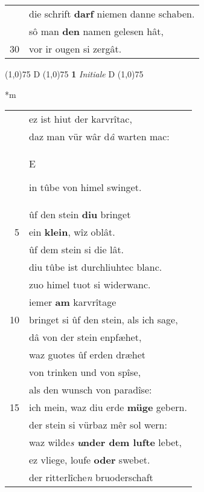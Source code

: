 \documentclass[8pt,a4paper,notitlepage]{article}
\begin{document}
\begin{table}[ht]
\begin{minipage}[t]{0.5\linewidth}
\begin{tabular}{rl}
 & die schrift \textbf{darf} niemen danne schaben.\\ 
 & sô man \textbf{den} namen gelesen hât,\\ 
30 & vor ir ougen si zergât.\\ 
\end{tabular}
\scriptsize
\line(1,0){75} \newline
D \newline
\line(1,0){75} \newline
\textbf{1} \textit{Initiale} D  \newline
\line(1,0){75} \newline
\newline
\end{minipage}
\hspace{0.5cm}
\begin{minipage}[t]{0.5\linewidth}
\small
\begin{center}*m
\end{center}
\begin{tabular}{rl}
 & ez ist hiut der karvrîtac,\\ 
 & daz man vür wâr d\textit{â} warten mac:\\ 
 & \begin{large}E\end{large}in tûbe von himel swinget.\\ 
 & ûf den stein \textbf{diu} bringet\\ 
5 & ein \textbf{klein}, wîz oblât.\\ 
 & ûf dem stein si die lât.\\ 
 & diu tûbe ist durchliuhtec blanc.\\ 
 & zuo himel tuot si widerwanc.\\ 
 & iemer \textbf{am} karvrîtage\\ 
10 & bringet si ûf den stein, als ich sage,\\ 
 & dâ von der stein enpfæhet,\\ 
 & waz guotes ûf erden dræhet\\ 
 & von trinken und von spîse,\\ 
 & als den wunsch von paradîse:\\ 
15 & ich mein, waz diu erde \textbf{müge} gebern.\\ 
 & der stein si vürbaz mêr sol wern:\\ 
 & waz wilde\textit{s} \textbf{\textit{u}nder dem lufte} lebet,\\ 
 & ez vliege, loufe \textbf{oder} swebet.\\ 
 & der ritterlîche\textit{n} bruoderschaft\\ 

\end{tabular}
\end{minipage}
\end{table}
\end{document}
